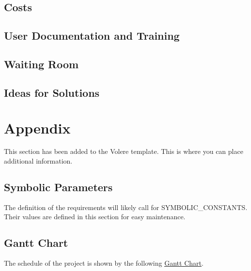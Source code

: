 \documentclass[12pt, titlepage]{article}
\begin{document}
\subsection{Costs}

\subsection{User Documentation and Training}

\subsection{Waiting Room}

\subsection{Ideas for Solutions}





\newpage

\section{Appendix}

This section has been added to the Volere template.  This is where you can place
additional information.

\subsection{Symbolic Parameters}

The definition of the requirements will likely call for SYMBOLIC\_CONSTANTS.
Their values are defined in this section for easy maintenance.

\subsection{Gantt Chart}

The schedule of the project is shown by the following
 \href{run:../DevelopmentPlan/GanttChart.gan} {\underline{Gantt Chart}}.
\end{document}
